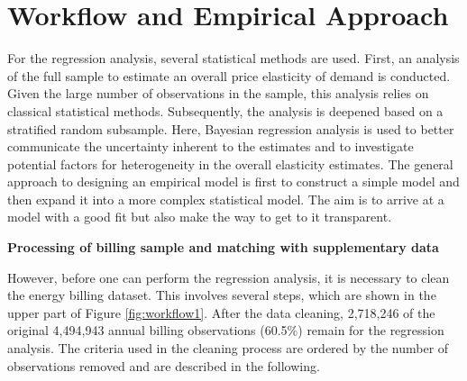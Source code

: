 \documentclass[12pt,twoside]{reedthesis}
\begin{document}
\hypertarget{workflow-empirical-approach}{%
\section{Workflow and Empirical Approach}\label{workflow-empirical-approach}}

For the regression analysis, several statistical methods are used. First, an analysis of the full sample to estimate an overall price elasticity of demand is conducted. Given the large number of observations in the sample, this analysis relies on classical statistical methods. Subsequently, the analysis is deepened based on a stratified random subsample. Here, Bayesian regression analysis is used to better communicate the uncertainty inherent to the estimates and to investigate potential factors for heterogeneity in the overall elasticity estimates. The general approach to designing an empirical model is first to construct a simple model and then expand it into a more complex statistical model. The aim is to arrive at a model with a good fit but also make the way to get to it transparent.

\textbf{Processing of billing sample and matching with supplementary data}

However, before one can perform the regression analysis, it is necessary to clean the energy billing dataset. This involves several steps, which are shown in the upper part of Figure \ref{fig:workflow1}. After the data cleaning, 2,718,246 of the original 4,494,943 annual billing observations (60.5\%) remain for the regression analysis. The criteria used in the cleaning process are ordered by the number of observations removed and are described in the following.
\end{document}
